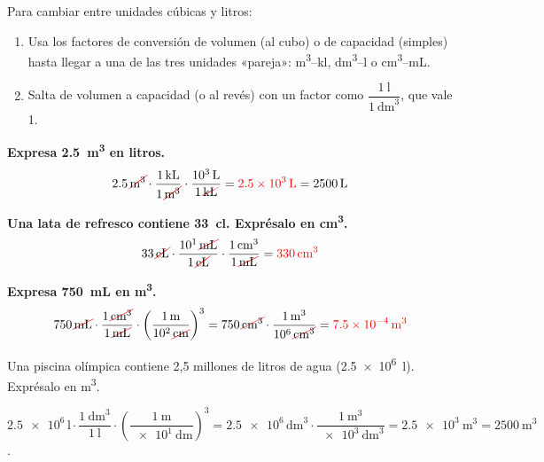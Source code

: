 \begin{impt}
    Para cambiar entre unidades cúbicas y litros:
    \begin{enumerate}[label=\numberballmDarkTeal]
        \item Usa los factores de conversión de volumen (al cubo) o de capacidad (simples) hasta llegar a una de las tres unidades «pareja»: \unit{\cubic\m}--\unit{\kilo\litre}, \unit{\cubic\dm}--\unit{\litre} o \unit{\cubic\cm}--\unit{\mL}.
        \item Salta de volumen a capacidad (o al revés) con un factor como \(\dfrac{\qty{1}{\litre}}{\qty{1}{\cubic\dm}}\), que vale 1.
    \end{enumerate}
\end{impt}

\begin{example}
    \textbf{Expresa \qty{2.5}{\cubic\m} en litros.}
    \begin{equation*}
        \num{2.5}\,\cancelunit{\cubic\m} \cdot \dfrac{\qty{1}{\kilo\litre}}{1\,\cancelunit{\cubic\m}} \cdot \dfrac{\qty{e3}{\litre}}{1\,\cancelunit{\kilo\litre}} = \textcolor{red}{\qty{2.5e3}{\litre}} = \qty{2500}{\litre}
    \end{equation*}
\end{example}

\begin{example}
    \textbf{Una lata de refresco contiene \qty{33}{\centi\litre}. Exprésalo en \unit{\cubic\cm}.}
    \begin{equation*}
        \num{33}\,\cancelunit{\centi\litre} \cdot \dfrac{\num{e1}\,\cancelunit{\mL}}{1\,\cancelunit{\centi\litre}} \cdot \dfrac{\qty{1}{\cubic\cm}}{1\,\cancelunit{\mL}} = \textcolor{red}{\qty{330}{\cubic\cm}}
    \end{equation*}
\end{example}

\begin{example}
    \textbf{Expresa \qty{750}{\mL} en \unit{\cubic\m}.}
    \begin{equation*}
        \num{750}\,\cancelunit{\mL} \cdot \dfrac{1\,\cancelunit{\cubic\cm}}{1\,\cancelunit{\mL}} \cdot \left(\dfrac{\qty{1}{\m}}{\num{e2}\,\cancelunit{\cm}}\right)^{3}
        = \num{750}\,\cancelunit{\cubic\cm} \cdot \dfrac{\qty{1}{\cubic\m}}{\num{e6}\,\cancelunit{\cubic\cm}} = \textcolor{red}{\qty{7.5e-4}{\cubic\m}}
    \end{equation*}
\end{example}

\begin{exercise}
    Una piscina olímpica contiene 2,5 millones de litros de agua (\qty{2.5e6}{\litre}). Exprésalo en \unit{\cubic\metre}.
    \begin{solu}
        \(\num{2.5e6}\,\unit{\litre} \cdot \dfrac{\qty{1}{\cubic\dm}}{\qty{1}{\litre}} \cdot \left(\dfrac{\qty{1}{\m}}{\qty{e1}{\dm}}\right)^{3} = \num{2.5e6}\,\unit{\cubic\dm} \cdot \dfrac{\qty{1}{\cubic\m}}{\qty{e3}{\cubic\dm}} = \qty{2.5e3}{\cubic\m} = \qty{2500}{\cubic\m}\).
    \end{solu}
\end{exercise}

